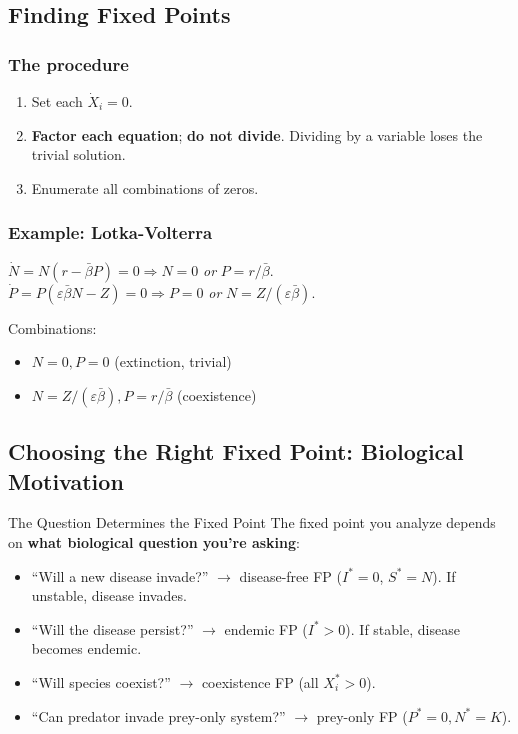 \documentclass[11pt]{article}
\begin{document}
\subsection{Finding Fixed Points}

\subsubsection{The procedure}
\begin{enumerate}
\item Set each $\dot X_i = 0$.
\item \textbf{Factor each equation}; \textbf{do not divide}. Dividing by a variable loses the trivial solution.
\item Enumerate all combinations of zeros.
\end{enumerate}

\subsubsection{Example: Lotka-Volterra}
$\dot N = N(r - \bar\beta P) = 0 \Rightarrow N = 0$ \textit{or} $P = r/\bar\beta$.\\
$\dot P = P(\varepsilon\bar\beta N - Z) = 0 \Rightarrow P = 0$ \textit{or} $N = Z/(\varepsilon\bar\beta)$.

Combinations:
\begin{itemize}
\item $N=0, P=0$ (extinction, trivial)
\item $N=Z/(\varepsilon\bar\beta), P=r/\bar\beta$ (coexistence)
\end{itemize}

\subsection{Choosing the Right Fixed Point: Biological Motivation}

\begin{conceptbox}{The Question Determines the Fixed Point}
The fixed point you analyze depends on \textbf{what biological question you're asking}:
\begin{itemize}
\item ``Will a new disease invade?'' $\to$ disease-free FP ($I^*=0$, $S^*=N$). If unstable, disease invades.
\item ``Will the disease persist?'' $\to$ endemic FP ($I^*>0$). If stable, disease becomes endemic.
\item ``Will species coexist?'' $\to$ coexistence FP (all $X_i^* > 0$).
\item ``Can predator invade prey-only system?'' $\to$ prey-only FP ($P^*=0, N^*=K$).
\end{itemize}
\end{conceptbox}
\end{document}
